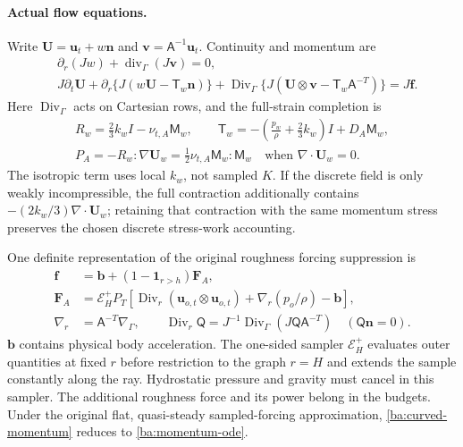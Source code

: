 \documentclass[11pt,a4paper]{article}
\numberwithin{equation}{section}
\begin{document}
\paragraph{Actual flow equations.}
Write $\boldsymbol U=\boldsymbol u_t+w\boldsymbol n$ and
$\boldsymbol v=\mathsf A^{-1}\boldsymbol u_t$. Continuity and momentum
are
\begin{align}
 &\partial_r(Jw)+\operatorname{div}_\Gamma(J\boldsymbol v)=0,
 \label{ba:curved-continuity}\\
 &J\partial_t\boldsymbol U
 +\partial_r\{J(w\boldsymbol U-\mathsf T_w\boldsymbol n)\}
 +\operatorname{Div}_\Gamma
    \{J(\boldsymbol U\otimes\boldsymbol v-\mathsf T_w\mathsf A^{-T})\}
 =J\boldsymbol f.
 \label{ba:curved-momentum}
\end{align}
Here $\operatorname{Div}_\Gamma$ acts on Cartesian rows, and the
full-strain completion is
\begin{equation}
 \begin{gathered}
 R_w=\tfrac23k_wI-\nu_{t,A}\mathsf M_w,\qquad
 \mathsf T_w=-\left(\frac{p_w}{\rho}+\tfrac23k_w\right)I+D_A\mathsf M_w,\\
 P_A=-R_w:\nabla\boldsymbol U_w
     =\tfrac12\nu_{t,A}\mathsf M_w:\mathsf M_w
       \quad\text{when }\nabla\cdot\boldsymbol U_w=0.
 \end{gathered}
 \label{ba:curved-stress}
\end{equation}
The isotropic term uses local $k_w$, not sampled $K$. If the discrete
field is only weakly incompressible, the full contraction additionally
contains $-(2k_w/3)\nabla\cdot\boldsymbol U_w$; retaining that contraction
with the same momentum stress preserves the chosen discrete stress-work
accounting.

One definite representation of the original roughness forcing suppression
is
\begin{equation}
 \begin{aligned}
 \boldsymbol f&=\boldsymbol b+
           (1-\mathbf1_{r>h})\boldsymbol F_A,\\
 \boldsymbol F_A&=\mathcal E_H^+P_T
 \left[\operatorname{Div}_r
           (\boldsymbol u_{o,t}\otimes\boldsymbol u_{o,t})
        +\nabla_r(p_o/\rho)-\boldsymbol b\right],\\
 \nabla_r&=\mathsf A^{-T}\nabla_\Gamma,\qquad
 \operatorname{Div}_r\mathsf Q
 =J^{-1}\operatorname{Div}_\Gamma(J\mathsf Q\mathsf A^{-T})
 \quad(\mathsf Q\boldsymbol n=0).
 \end{aligned}
 \label{ba:rough-force}
\end{equation}
$\boldsymbol b$ contains physical body acceleration. The one-sided
sampler $\mathcal E_H^+$ evaluates outer quantities at fixed $r$ before
restriction to the graph $r=H$ and extends the sample constantly along
the ray. Hydrostatic pressure and gravity must cancel in this sampler.
The additional roughness force and its power belong in the budgets.
Under the original flat, quasi-steady sampled-forcing approximation,
\eqref{ba:curved-momentum} reduces to \eqref{ba:momentum-ode}.
\end{document}
